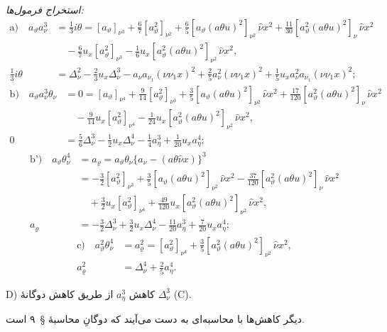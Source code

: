 \documentclass[11pt]{article}
\providecommand{\A}{\Delta}
\providecommand{\R}{\varrho}
\begin{document}
\noindent\emph{استخراج فرمول‌ها:}
\[
\begin{aligned}
\text{a)}\quad
 a_\vartheta a_\nu^3
&=\frac13 i\theta
=[a_\vartheta]_{\nu^3}+\frac67[a_\vartheta^2]_{\nu^2}
+\frac65[a_\vartheta(a\theta u)^2]_{\nu^2}\,\widehat{\nu}x^2
+\frac{11}{30}[a_\vartheta^2(a\theta u)^2]_{\nu}\,\widehat{\nu}x^2\\
&\quad-\frac67u_x[a_\vartheta^2]_{\nu^3}
-\frac16u_x[a_\vartheta^2(a\theta u)^2]_{\nu^2}\,\widehat{\nu}x^2,\\
\frac13 i\theta
&=\A_\nu^2-\frac23u_x\A_\nu^3-a_\nu a_{\nu_1}(\nu\nu_1x)^2
+\frac25a_\nu^2(\nu\nu_1x)^2
+\frac15u_xa_\nu^2a_{\nu_1}(\nu\nu_1x)^2;
\end{aligned}
\]
\[
\begin{aligned}
\text{b)}\quad
 a_\vartheta a_\nu^3\theta_\nu
&=0=[a_\vartheta]_{\nu^4}+\frac9{14}[a_\vartheta^2]_{\nu^3}
+\frac35[a_\vartheta(a\theta u)^2]_{\nu^2}\,\widehat{\nu}x^2
+\frac{17}{120}[a_\vartheta^2(a\theta u)^2]_{\nu}\,\widehat{\nu}x^2\\
&\quad-\frac9{14}u_x[a_\vartheta^2]_{\nu^4}
-\frac1{24}u_x[a_\vartheta^2(a\theta u)^2]_{\nu^2}\,\widehat{\nu}x^2,\\
0&=\frac56\A_\nu^3-\frac12u_x\A_\nu^4-\frac14a_\eta^3+\frac1{20}u_xa_\eta^4;
\end{aligned}
\]
\[
\begin{aligned}
\text{b')}\quad
 a_\vartheta\theta_\nu^4
&=a_\R=a_\vartheta\theta_\nu\{a_\nu-(a\theta\widehat{\nu}x)\}^3\\
&=-\frac32[a_\vartheta^2]_{\nu^3}
+\frac35[a_\vartheta(a\theta u)^2]_{\nu^2}\,\widehat{\nu}x^2
-\frac{37}{120}[a_\vartheta^2(a\theta u)^2]_{\nu}\,\widehat{\nu}x^2\\
&\quad+\frac32u_x[a_\vartheta^2]_{\nu^4}
+\frac{49}{120}u_x[a_\vartheta^2(a\theta u)^2]_{\nu^2}\,\widehat{\nu}x^2,\\
a_\R&=-\frac32\A_\nu^3+\frac32u_x\A_\nu^4-\frac{11}{20}a_\eta^3+\frac7{20}u_xa_\eta^4;
\end{aligned}
\]
\[
\begin{aligned}
\text{c)}\quad
 a_\vartheta^2\theta_\nu^4
&=a_\R^2=[a_\vartheta^2]_{\nu^4}+\frac35[a_\vartheta^2(a\theta u)^2]_{\nu^2}\,\widehat{\nu}x^2,\\
a_\R^2&=\A_\nu^4+\frac25a_\eta^4.
\end{aligned}
\]

\noindent D) کاهش $a_\eta^3$ از طریق کاهش دوگانهٔ $\A_\nu^3$ (C).

دیگر کاهش‌ها با محاسبه‌ای به دست می‌آیند که دوگانِ محاسبهٔ \S\ ۹ است.
\end{document}
